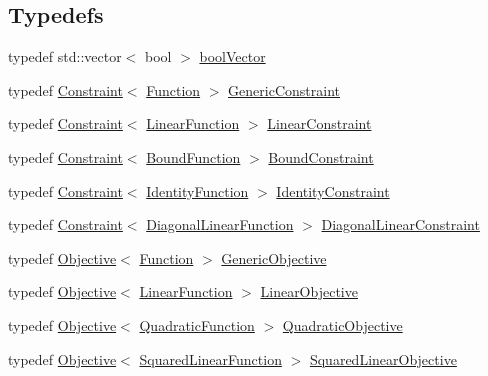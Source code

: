 \subsection*{Typedefs}
\begin{DoxyCompactItemize}
\item 
typedef std\+::vector$<$ bool $>$ \hyperlink{namespaceocra_afaf4559cfedb560f8d1fe9bf6a21678f}{bool\+Vector}
\item 
typedef \hyperlink{classocra_1_1Constraint}{Constraint}$<$ \hyperlink{classocra_1_1Function}{Function} $>$ \hyperlink{namespaceocra_af10341108ce661566aad00908668e2b1}{Generic\+Constraint}
\item 
typedef \hyperlink{classocra_1_1Constraint}{Constraint}$<$ \hyperlink{classocra_1_1LinearFunction}{Linear\+Function} $>$ \hyperlink{namespaceocra_ae8b87cf4099be3efc3b410019ad2046e}{Linear\+Constraint}
\item 
typedef \hyperlink{classocra_1_1Constraint}{Constraint}$<$ \hyperlink{classocra_1_1BoundFunction}{Bound\+Function} $>$ \hyperlink{namespaceocra_a6e55fff77635080219964abc301abf18}{Bound\+Constraint}
\item 
typedef \hyperlink{classocra_1_1Constraint}{Constraint}$<$ \hyperlink{classocra_1_1IdentityFunction}{Identity\+Function} $>$ \hyperlink{namespaceocra_a5fc023ff4ef8f4b0cdf410e088090731}{Identity\+Constraint}
\item 
typedef \hyperlink{classocra_1_1Constraint}{Constraint}$<$ \hyperlink{classocra_1_1DiagonalLinearFunction}{Diagonal\+Linear\+Function} $>$ \hyperlink{namespaceocra_ab310e2c53f5e52ec3aba0a832f7dc79e}{Diagonal\+Linear\+Constraint}
\item 
typedef \hyperlink{classocra_1_1Objective}{Objective}$<$ \hyperlink{classocra_1_1Function}{Function} $>$ \hyperlink{namespaceocra_a37a91885f4fa5c523d22cb15d5673062}{Generic\+Objective}
\item 
typedef \hyperlink{classocra_1_1Objective}{Objective}$<$ \hyperlink{classocra_1_1LinearFunction}{Linear\+Function} $>$ \hyperlink{namespaceocra_a1dc9b2b863ed7542eb48b66c2fe5793a}{Linear\+Objective}
\item 
typedef \hyperlink{classocra_1_1Objective}{Objective}$<$ \hyperlink{classocra_1_1QuadraticFunction}{Quadratic\+Function} $>$ \hyperlink{namespaceocra_a0b50673710f087c0f1733aefd1a8e0f7}{Quadratic\+Objective}
\item 
typedef \hyperlink{classocra_1_1Objective}{Objective}$<$ \hyperlink{classocra_1_1SquaredLinearFunction}{Squared\+Linear\+Function} $>$ \hyperlink{namespaceocra_aa6eaed809f9ce42cd96ecd92ddc61f0a}{Squared\+Linear\+Objective}

\end{DoxyCompactItemize}
